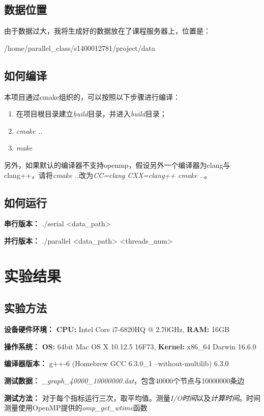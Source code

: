 \documentclass{article}
\begin{document}
	\subsection{数据位置}
	由于数据过大，我将生成好的数据放在了课程服务器上，位置是：
	
	/home/parallel\_class/s1400012781/project/data
	
	\subsection{如何编译}
	本项目通过cmake组织的，可以按照以下步骤进行编译：
	\begin{enumerate}
		\item 在项目根目录建立\emph{build}目录，并进入\emph{build}目录；
		\item \emph{cmake ..}
		\item \emph{make}
	\end{enumerate}
	
	另外，如果默认的编译器不支持openmp，假设另外一个编译器为clang与clang++，请将\emph{cmake ..}改为\emph{CC=clang CXX=clang++ cmake ..}。
	
	\subsection{如何运行}
	\textbf{串行版本：} ./serial <data\_path>
	
	\textbf{并行版本：} ./parallel <data\_path> <threads\_num>
	
	\section{实验结果}
	\subsection{实验方法}
	\textbf{设备硬件环境：} \textbf{CPU:} Intel Core i7-6820HQ @ 2.70GHz, \textbf{RAM:} 16GB
	
	\textbf{操作系统：} \textbf{OS:} 64bit Mac OS X 10.12.5 16F73, \textbf{Kernel:} x86\_64 Darwin 16.6.0
	
	\textbf{编译器版本：} g++-6 (Homebrew GCC 6.3.0\_1 --without-multilib) 6.3.0
	
	\textbf{测试数据：} \emph{\_graph\_40000\_10000000.dat}，包含40000个节点与10000000条边
	
	\textbf{测试方法：} 对于每个指标运行三次，取平均值。测量\emph{I/O时间}以及\emph{计算时间}。时间测量使用OpenMP提供的\emph{omp\_get\_wtime}函数
\end{document}

